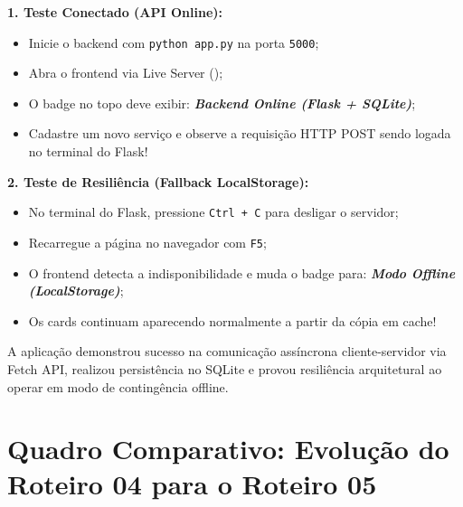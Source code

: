 \textbf{1. Teste Conectado (API Online):}
\begin{itemize}
  \item Inicie o backend com \texttt{python app.py} na porta \texttt{5000};
  \item Abra o frontend via Live Server ();
  \item O badge no topo deve exibir: \textbf{\textit{Backend Online (Flask + SQLite)}};
  \item Cadastre um novo serviço e observe a requisição HTTP POST sendo logada no terminal do Flask!
\end{itemize}

\textbf{2. Teste de Resiliência (Fallback LocalStorage):}
\begin{itemize}
  \item No terminal do Flask, pressione \texttt{Ctrl + C} para desligar o servidor;
  \item Recarregue a página no navegador com \texttt{F5};
  \item O frontend detecta a indisponibilidade e muda o badge para: \textbf{\textit{Modo Offline (LocalStorage)}};
  \item Os cards continuam aparecendo normalmente a partir da cópia em cache!
\end{itemize}

\begin{boxTeste}
A aplicação demonstrou sucesso na comunicação assíncrona cliente-servidor via Fetch API, realizou persistência no SQLite e provou resiliência arquitetural ao operar em modo de contingência offline.
\end{boxTeste}


\section{Quadro Comparativo: Evolução do Roteiro 04 para o Roteiro 05}\label{sec:m4a}

